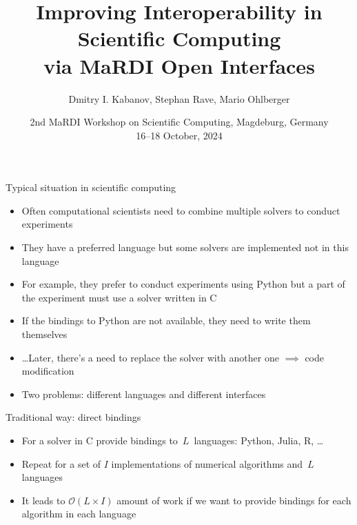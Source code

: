 \documentclass[10pt, aspectratio=169, progressbar=frametitle]{beamer}
\title{%
  Improving Interoperability in Scientific Computing\\
  via MaRDI Open Interfaces}
\author{Dmitry I. Kabanov, Stephan Rave, Mario Ohlberger}
\institute{Institute for Analysis and Numerics, University of Münster}
\date{{\large 2nd MaRDI Workshop on Scientific Computing, Magdeburg, Germany}\\{16--18 October, 2024}}
\begin{document}
\maketitle

\begin{frame}{Typical situation in scientific computing}
  \begin{itemize}
    \item Often computational scientists need
          to combine multiple solvers to conduct experiments
    \item They have a preferred language but some solvers are implemented
          not in this language
    \item For example, they prefer to conduct experiments using Python
          but a part of the experiment must use a solver written in C
    \item If the bindings to Python are not available, they need to write
          them themselves
    \item \dots Later, there's a need to replace the solver with
          another one $\implies$ code modification
    \item<2-> \alert{Two problems:} different languages and different interfaces
  \end{itemize}
\end{frame}

\begin{frame}{Traditional way: direct bindings}
  \begin{minipage}{0.45\textwidth}
    \begin{itemize}
      \item For a solver in C provide bindings to~$L$~languages: Python, Julia, R, \dots
      \item Repeat for a set of $I$ implementations of numerical algorithms
            and~$L$ languages
      \item It leads to $\mathcal O(L \times I)$ amount of work if we want to provide
            bindings for each algorithm in each language
    \end{itemize}
  \end{minipage}\hfill
  \begin{minipage}{0.45\textwidth}
    
  \end{minipage}
\end{frame}
\end{document}
